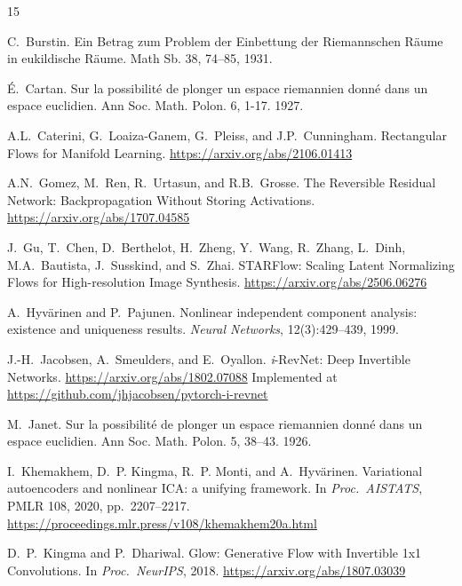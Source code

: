 \begin{thebibliography}{15}

C.~Burstin.
\newblock Ein Betrag zum Problem der Einbettung der Riemannschen R\"aume in eukildische 
R\"aume. 
\newblock Math Sb. 38, 74–85, 1931.

\'E.~Cartan.
\newblock Sur la possibilit\'e de plonger un espace riemannien donn\'e dans un espace euclidien. \newblock Ann Soc. Math. Polon. 6, 1-17. 1927.

A.L.~Caterini, G.~Loaiza-Ganem, G.~Pleiss, and J.P.~Cunningham.
\newblock Rectangular Flows for Manifold Learning.
\newblock \url{https://arxiv.org/abs/2106.01413}

A.N.~Gomez, M.~Ren, R.~Urtasun, and R.B.~Grosse.
\newblock The Reversible Residual Network: Backpropagation Without Storing Activations.
\newblock \url{https://arxiv.org/abs/1707.04585}

J.~Gu, T.~Chen, D.~Berthelot, H.~Zheng, Y.~Wang, R.~Zhang, L.~Dinh, M.A.~Bautista, J.~Susskind, and S.~Zhai.
\newblock STARFlow: Scaling Latent Normalizing Flows for High-resolution Image Synthesis.
\newblock \url{https://arxiv.org/abs/2506.06276}

A.~Hyv{\"a}rinen and P.~Pajunen.
\newblock Nonlinear independent component analysis: existence and uniqueness results.
\newblock \emph{Neural Networks}, 12(3):429--439, 1999.

J.-H.~Jacobsen, A.~Smeulders, and E.~Oyallon.
\newblock \textit{i}-RevNet: Deep Invertible Networks.
\newblock \url{https://arxiv.org/abs/1802.07088}
\newblock Implemented at \url{https://github.com/jhjacobsen/pytorch-i-revnet}

M.~Janet.
\newblock Sur la possibilit\'e de plonger un espace riemannien donn\'e dans un espace euclidien. \newblock Ann Soc. Math. Polon. 5, 38–43. 1926.

I.~Khemakhem, D.~P. Kingma, R.~P. Monti, and A.~Hyv{\"a}rinen.
\newblock Variational autoencoders and nonlinear {ICA}: a unifying framework.
\newblock In \emph{Proc.\ AISTATS}, PMLR 108, 2020, pp.~2207--2217.
\newblock \url{https://proceedings.mlr.press/v108/khemakhem20a.html}

D.~P.~Kingma and P.~Dhariwal.
\newblock Glow: Generative Flow with Invertible 1x1 Convolutions.
\newblock In \emph{Proc.\ NeurIPS}, 2018.
\newblock \url{https://arxiv.org/abs/1807.03039}


\end{thebibliography}
